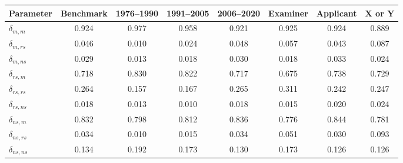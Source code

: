 \begin{tabular}{lccccccc}
\toprule
Parameter & Benchmark & 1976--1990 & 1991--2005 & 2006--2020 & Examiner & Applicant & X or Y \\
\midrule
$\delta_{m,m}$ & 0.924 & 0.977 & 0.958 & 0.921 & 0.925 & 0.924 & 0.889 \\
$\delta_{m,rs}$ & 0.046 & 0.010 & 0.024 & 0.048 & 0.057 & 0.043 & 0.087 \\
$\delta_{m,ns}$ & 0.029 & 0.013 & 0.018 & 0.030 & 0.018 & 0.033 & 0.024 \\
$\delta_{rs,m}$ & 0.718 & 0.830 & 0.822 & 0.717 & 0.675 & 0.738 & 0.729 \\
$\delta_{rs,rs}$ & 0.264 & 0.157 & 0.167 & 0.265 & 0.311 & 0.242 & 0.247 \\
$\delta_{rs,ns}$ & 0.018 & 0.013 & 0.010 & 0.018 & 0.015 & 0.020 & 0.024 \\
$\delta_{ns,m}$ & 0.832 & 0.798 & 0.812 & 0.836 & 0.776 & 0.844 & 0.781 \\
$\delta_{ns,rs}$ & 0.034 & 0.010 & 0.015 & 0.034 & 0.051 & 0.030 & 0.093 \\
$\delta_{ns,ns}$ & 0.134 & 0.192 & 0.173 & 0.130 & 0.173 & 0.126 & 0.126 \\
\bottomrule
\end{tabular}

